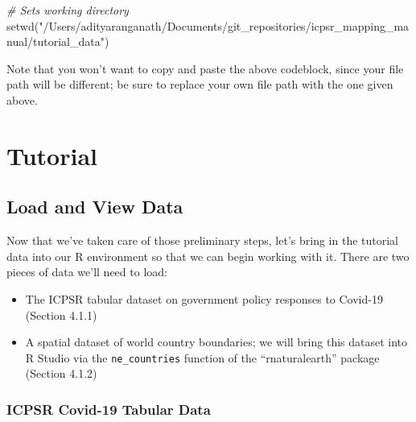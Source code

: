 \documentclass[
]{article}
\newenvironment{Shaded}{\begin{snugshade}}{\end{snugshade}}
\newcommand{\CommentTok}[1]{\textcolor[rgb]{0.56,0.35,0.01}{\textit{#1}}}
\newcommand{\FunctionTok}[1]{\textcolor[rgb]{0.00,0.00,0.00}{#1}}
\newcommand{\NormalTok}[1]{#1}
\newcommand{\StringTok}[1]{\textcolor[rgb]{0.31,0.60,0.02}{#1}}
\providecommand{\tightlist}{%
  \setlength{\itemsep}{0pt}\setlength{\parskip}{0pt}}
\begin{document}
\begin{Shaded}
\begin{Highlighting}[]
\CommentTok{\# Sets working directory }
\FunctionTok{setwd}\NormalTok{(}\StringTok{"/Users/adityaranganath/Documents/git\_repositories/icpsr\_mapping\_manual/tutorial\_data"}\NormalTok{)}
\end{Highlighting}
\end{Shaded}

Note that you won't want to copy and paste the above codeblock, since your file path will be different; be sure to replace your own file path with the one given above.

\hypertarget{tutorial}{%
\section{Tutorial}\label{tutorial}}

\hypertarget{load-and-view-data}{%
\subsection{Load and View Data}\label{load-and-view-data}}

Now that we've taken care of those preliminary steps, let's bring in the tutorial data into our R environment so that we can begin working with it. There are two pieces of data we'll need to load:

\begin{itemize}
\tightlist
\item
  The ICPSR tabular dataset on government policy responses to Covid-19 (Section 4.1.1)
\item
  A spatial dataset of world country boundaries; we will bring this dataset into R Studio via the \texttt{ne\_countries} function of the ``rnaturalearth'' package (Section 4.1.2)
\end{itemize}

\hypertarget{icpsr-covid-19-tabular-data}{%
\subsubsection{ICPSR Covid-19 Tabular Data}\label{icpsr-covid-19-tabular-data}}
\end{document}

